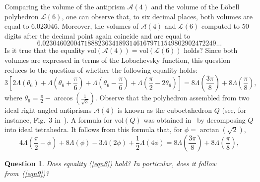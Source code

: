 \documentclass{amsart}
\newtheorem{question}{Question}[section]
\newcommand{\vol}{\mathrm{vol}}
\begin{document}
Comparing the volume of the antiprism $\mathcal A(4)$ and the volume of the L\"obell polyhedron $\mathcal L(6)$, one can observe that, to six decimal places, both volumes are equal to $6.023046$. Moreover, the volumes of $\mathcal A(4)$ and $\mathcal L(6)$ computed to 50 digits after the decimal point again coincide and are equal to
$$
6.02304602004718882363418931461679711549802902472249\ldots
$$
Is it true that the equality $\vol (\mathcal A(4)) = \vol (\mathcal L(6))$ holds? Since both volumes are expressed in terms of the Lobachevsky function, this question reduces to the question of whether the following equality holds:
\begin{equation} \label{eqn8}
3 \left[ 2 \Lambda (\theta_6)  +  \Lambda \left( \theta_6 + \frac{\pi}{6} \right)  +  \Lambda \left( \theta_6 - \frac{\pi}{6} \right)  +  \Lambda \left( \frac{\pi}{2} - 2 \theta_6 \right) \right] 
= 8 \Lambda \left( \frac{3 \pi}{8} \right) + 8  \Lambda \left(\frac{\pi}{8}\right),   
\end{equation} 
where $\theta_6  =  \frac{\pi}{2}  -  \arccos  \left(\frac{1}{\sqrt{3}} \right)$.
Observe that the polyhedron assembled from two ideal right-angled antiprisms $\mathcal A(4)$ is known as the cuboctahedron $Q$ (see, for instance, Fig.~3 in~\cite{VeEg25}). A formula for $\vol(Q)$ was obtained in~\cite[Lem.~5.5]{Ad26} by decomposing $Q$ into ideal tetrahedra. It follows from this formula that, for $\phi=\arctan(\sqrt{2})$,
\begin{equation} \label{eqn9}
4  \Lambda \left(\frac{\pi}{2} - \phi \right)  + 8 \Lambda \left( \phi \right)  - 3  \Lambda \left( 2 \phi \right)  +  \frac{1}{2} \Lambda \left( 4 \phi \right) 
= 8 \Lambda \left( \frac{3 \pi}{8} \right) + 8  \Lambda \left(\frac{\pi}{8}\right),   
\end{equation} 

\begin{question} \label{question1}
{\rm 
Does equality (\ref{eqn8}) hold? In particular, does it follow from~(\ref{eqn9})? 
}
\end{question}
\end{document}
